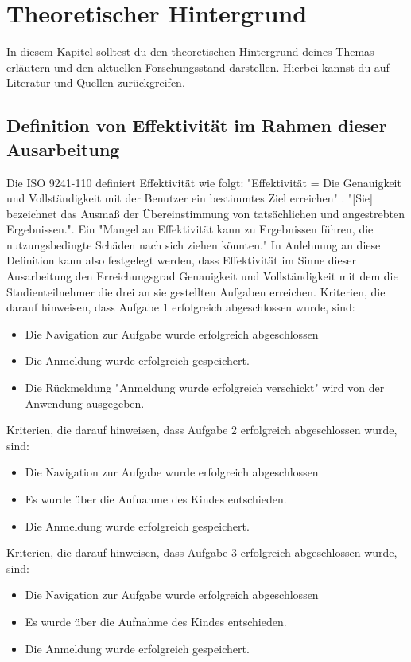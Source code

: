 \section{Theoretischer Hintergrund}
In diesem Kapitel solltest du den theoretischen Hintergrund deines Themas erläutern und den aktuellen Forschungsstand darstellen. Hierbei kannst du auf Literatur und Quellen zurückgreifen.

\subsection{Definition von Effektivität im Rahmen dieser Ausarbeitung }
Die ISO 9241-110 definiert Effektivität wie folgt: "Effektivität = Die Genauigkeit und Vollständigkeit mit der Benutzer ein bestimmtes Ziel erreichen" \cite{ISO-9241-110}. 
"[Sie] bezeichnet das Ausmaß der Übereinstimmung von tatsächlichen und angestrebten Ergebnissen."\cite{iso-9241-11}. Ein "Mangel an Effektivität kann zu Ergebnissen führen, die nutzungsbedingte Schäden nach sich ziehen könnten."\cite{iso-9241-11}
In Anlehnung an diese Definition kann also festgelegt werden, dass Effektivität im Sinne dieser Ausarbeitung den Erreichungsgrad Genauigkeit und Vollständigkeit mit dem die Studienteilnehmer die drei an sie gestellten Aufgaben erreichen. 
Kriterien, die darauf hinweisen, dass Aufgabe 1 erfolgreich abgeschlossen wurde, sind: 
\begin{itemize}
    \item Die Navigation zur Aufgabe wurde erfolgreich abgeschlossen
    \item Die Anmeldung wurde erfolgreich gespeichert.
    \item Die Rückmeldung "Anmeldung wurde erfolgreich verschickt" wird von der Anwendung ausgegeben.
\end{itemize}

Kriterien, die darauf hinweisen, dass Aufgabe 2 erfolgreich abgeschlossen wurde, sind: 
\begin{itemize}
    \item Die Navigation zur Aufgabe wurde erfolgreich abgeschlossen
    \item Es wurde über die Aufnahme des Kindes entschieden.
    \item Die Anmeldung wurde erfolgreich gespeichert.
\end{itemize}

Kriterien, die darauf hinweisen, dass Aufgabe 3 erfolgreich abgeschlossen wurde, sind: 
\begin{itemize}
    \item Die Navigation zur Aufgabe wurde erfolgreich abgeschlossen
    \item Es wurde über die Aufnahme des Kindes entschieden.
    \item Die Anmeldung wurde erfolgreich gespeichert.
\end{itemize}

